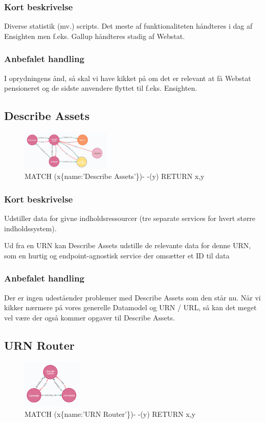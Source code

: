 \documentclass{article}
\begin{document}
\subsubsection*{Kort beskrivelse}
Diverse statistik (mv.) scripts. Det meste af funktionaliteten håndteres i dag af Ensighten men f.eks. Gallup håndteres stadig af Webstat.
\subsubsection*{Anbefalet handling}
I oprydningens ånd, så skal vi have kikket på om det er relevant at få Webstat pensioneret og de sidste anvendere flyttet til f.eks. Ensighten.


\subsection{Describe Assets}
\begin{figure}[h]
\includegraphics[width=120pt]{DescribeAssets.PNG}
\caption{MATCH (x\{name:'Describe Assets'\})- -(y) RETURN x,y}
\end{figure}
\subsubsection*{Kort beskrivelse}
Udstiller data for givne indholdsressourcer (tre separate services for hvert større indholdssystem).

Ud fra en URN kan Describe Assets udstille de relevante data for denne URN, som en hurtig og endpoint-agnostisk service der omsætter et ID til data
\subsubsection*{Anbefalet handling}
Der er ingen udeståender problemer med Describe Assets som den står nu. Når vi kikker nærmere på vores generelle Datamodel og URN / URL, så kan det meget vel være der også kommer opgaver til Describe Assets.


\subsection{URN Router}
\begin{figure}[h]
\includegraphics[width=80pt]{URNRouter.PNG}
\caption{MATCH (x\{name:'URN Router'\})- -(y) RETURN x,y}
\end{figure}
\end{document}
